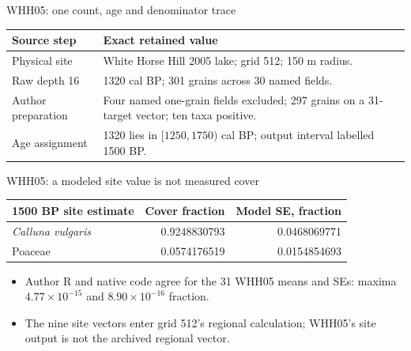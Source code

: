 \begin{frame}{WHH05: one count, age and denominator trace}
\small
\begin{tabular}{p{}p{}}
\toprule
Source step & Exact retained value \\
\midrule
Physical site & White Horse Hill 2005 lake; grid 512; 150 m radius. \\
Raw depth 16 & 1320 cal BP; 301 grains across 30 named fields. \\
Author preparation & Four named one-grain fields excluded; 297 grains on a 31-target vector; ten taxa positive. \\
Age assignment & 1320 lies in $[1250,1750)$ cal BP; output interval labelled 1500 BP. \\
\bottomrule
\end{tabular}
\end{frame}

\begin{frame}{WHH05: a modeled site value is not measured cover}
\small
\begin{tabular}{lrr}
\toprule
1500 BP site estimate & Cover fraction & Model SE, fraction \\
\midrule
\emph{Calluna vulgaris} & 0.9248830793 & 0.0468069771 \\
Poaceae & 0.0574176519 & 0.0154854693 \\
\bottomrule
\end{tabular}
\begin{itemize}
\item Author R and native code agree for the 31 WHH05 means and SEs: maxima $4.77\times10^{-15}$ and $8.90\times10^{-16}$ fraction.
\item The nine site vectors enter grid 512's regional calculation; WHH05's site output is not the archived regional vector.
\end{itemize}
\end{frame}

